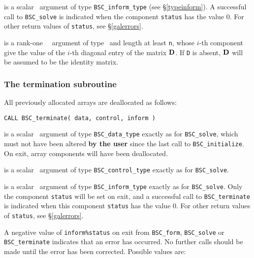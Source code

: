 \documentclass{galahad}
\newcommand{\packagename}{BSC}
\begin{document}
\begin{description}
 is a scalar \intentout\ argument of type
{\tt \packagename\_inform\_type}
(see \S\ref{typeinform}). A successful call to
{\tt \packagename\_solve}
is indicated when the  component {\tt status} has the value 0.
For other return values of {\tt status}, see \S\ref{galerrors}.

 is a rank-one \optional\ \intentin\ argument of type \realdp\
and length at least {\tt n}, whose $i$-th component give the value of the
$i$-th diagonal entry of the matrix ${\mathbf{D}}$. If {\tt D} is absent, ${\mathbf{D}}$
will be assumed to be the identity matrix.

\end{description}


\subsubsection{The  termination subroutine}
All previously allocated arrays are deallocated as follows:
\vspace*{1mm}

\hspace{8mm}
{\tt CALL \packagename\_terminate( data, control, inform )}

\begin{description}

 is a scalar \intentinout\ argument of type
{\tt \packagename\_data\_type}
exactly as for
{\tt \packagename\_solve},
which must not have been altered {\bf by the user} since the last call to
{\tt \packagename\_initialize}.
On exit, array components will have been deallocated.

 is a scalar \intentin\ argument of type
{\tt \packagename\_control\_type}
exactly as for
{\tt \packagename\_solve}.

 is a scalar \intentout\ argument of type
{\tt \packagename\_inform\_type}
exactly as for
{\tt \packagename\_solve}.
Only the component {\tt status} will be set on exit, and a
successful call to
{\tt \packagename\_terminate}
is indicated when this  component {\tt status} has the value 0.
For other return values of {\tt status}, see \S\ref{galerrors}.

\end{description}


\galerrors
A negative value of {\tt inform\%status} on exit from
{\tt \packagename\_form},
{\tt \packagename\_solve}
or
{\tt \packagename\_terminate}
indicates that an error has occurred. No further calls should be made
until the error has been corrected. Possible values are:
\end{document}
